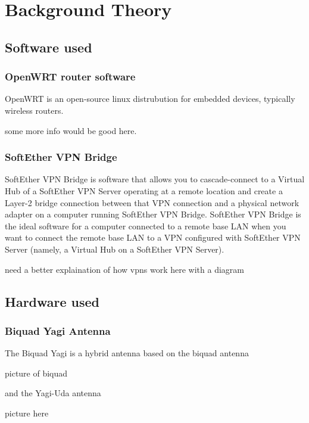 \section{Background Theory}

\subsection{Software used}
\subsubsection{OpenWRT router software}
OpenWRT is an open-source linux distrubution for embedded devices, typically wireless routers.

some more info would be good here.

\subsubsection{SoftEther VPN Bridge}
\label{sec:comms_theory_vpn} %
SoftEther VPN Bridge is software that allows you to cascade-connect to a Virtual Hub of a SoftEther VPN Server operating at a remote location and create a Layer-2 bridge connection between that VPN connection and a physical network adapter on a computer running SoftEther VPN Bridge. SoftEther VPN Bridge is the ideal software for a computer connected to a remote base LAN when you want to connect the remote base LAN to a VPN configured with SoftEther VPN Server (namely, a Virtual Hub on a SoftEther VPN Server).

need a better explaination of how vpns work here with a diagram 

\subsection{Hardware used}
\subsubsection{Biquad Yagi Antenna}
The Biquad Yagi is a hybrid antenna based on the biquad antenna

picture of biquad


and the Yagi-Uda antenna

picture here


